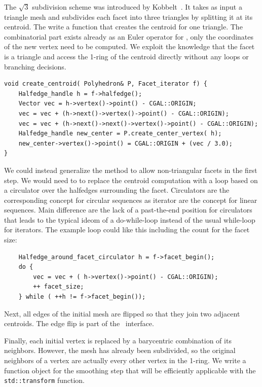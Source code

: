 
The $\sqrt{3}$ subdivision scheme was introduced by
Kobbelt~\cite{sqrt3}. It takes as input a triangle mesh and subdivides
each facet into three triangles by splitting it at its centroid.  The write
a function that creates the centroid for one triangle. The
combinatorial part exists already as an Euler operator for \cgalpoly,
only the coordinates of the new vertex need to be computed. We exploit
the knowledge that the facet is a triangle and access the 1-ring of
the centroid directly without any loops or branching decisions.

\begin{lstlisting}
void create_centroid( Polyhedron& P, Facet_iterator f) {
    Halfedge_handle h = f->halfedge();
    Vector vec = h->vertex()->point() - CGAL::ORIGIN;
    vec = vec + (h->next()->vertex()->point() - CGAL::ORIGIN);
    vec = vec + (h->next()->next()->vertex()->point() - CGAL::ORIGIN);
    Halfedge_handle new_center = P.create_center_vertex( h);
    new_center->vertex()->point() = CGAL::ORIGIN + (vec / 3.0);
}
\end{lstlisting}

We could instead generalize the method to allow non-triangular facets
in the first step. We would need to to replace the centroid
computation with a loop based on a circulator over the halfedges
surrounding the facet. Circulators are the corresponding concept for
circular sequences as iterator are the concept for linear sequences.
Main difference are the lack of a past-the-end position for
circulators that leads to the typical ideom of a do-while-loop instead
of the usual while-loop for iterators. The example loop could like this
including the count for the facet size:

\begin{lstlisting}
    Halfedge_around_facet_circulator h = f->facet_begin();
    do {
        vec = vec + ( h->vertex()->point() - CGAL::ORIGIN);
        ++ facet_size;
    } while ( ++h != f->facet_begin());
\end{lstlisting}

Next, all edges of the initial mesh are flipped so that they join two
adjacent centroids. The edge flip is part of the \cgalpoly\ interface.

Finally, each initial vertex is replaced by a barycentric combination
of its neighbors. However, the mesh has already been subdivided, so
the original neighbors of a vertex are actually every other vertex in
the 1-ring. We write a function object for the smoothing step that
will be efficiently applicable with the \lstinline!std::transform!
function.

